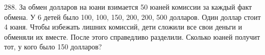 288. За обмен долларов на юани взимается 50 юаней комиссии за каждый факт обмена. У 6 детей было 100, 100, 150, 200, 200, 500 долларов. Один доллар стоит 4 юаня. Чтобы избежать лишних комиссий, дети сложили все свои деньги и обменяли их вместе. После этого справедливо разделили. Сколько юаней получит тот, у кого было 150 долларов?\\
